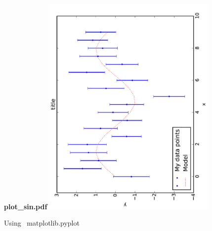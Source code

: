 \documentclass[10pt, t]{beamer}
\let\verb=\codeDelimTwiddles
\let\alert=\textbf
\begin{document}
\begin{frame}[label=sec-3-9]{\alert{plot\_sin.pdf}}
\includegraphics[angle=-90,width=8.5cm]{./figures/plot_sin}
\end{frame}

\begin{frame}[fragile,label=sec-3-10]{Using \verb~matplotlib.pyplot~}

%
\end{frame}
\end{document}
